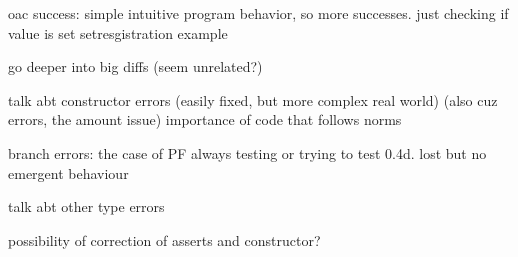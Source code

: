 oac success:
simple intuitive program behavior, so more successes. just checking if value is set
setresgistration example

go deeper into big diffs (seem unrelated?)

talk abt constructor errors (easily fixed, but more complex real world)
(also cuz errors, the amount issue)
importance of code that follows norms

branch errors: the case of PF always testing or trying to test 0.4d. lost but no emergent behaviour

talk abt other type errors

possibility of correction of asserts and constructor?